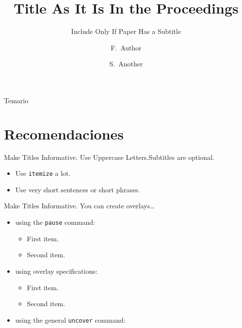 \documentclass{beamer}
\title[Short Paper Title]{Title As It Is In the Proceedings}
\subtitle{Include Only If Paper Has a Subtitle}
\author[Author, Another]{F.~Author\inst{1} \and S.~Another\inst{2}}
\date{}%
\begin{document}
\firstpage


\begin{frame}{Temario}
  \tableofcontents
\end{frame}


\section{Recomendaciones}

\begin{frame}{Make Titles Informative. Use Uppercase Letters.}{Subtitles are optional.}
  \begin{itemize}
  \item
    Use \texttt{itemize} a lot.
  \item
    Use very short sentences or short phrases.
  \end{itemize}
\end{frame}

\begin{frame}{Make Titles Informative.}
  You can create overlays\dots
  \begin{itemize}
  \item using the \texttt{pause} command:
    \begin{itemize}
    \item
      First item.
      \pause
    \item    
      Second item.
    \end{itemize}
  \item
    using overlay specifications:
    \begin{itemize}
    \item<3->
      First item.
    \item<4->
      Second item.
    \end{itemize}
  \item
    using the general \texttt{uncover} command:
    \begin{itemize}
    \end{itemize}
  \end{itemize}
\end{frame}
\end{document}
